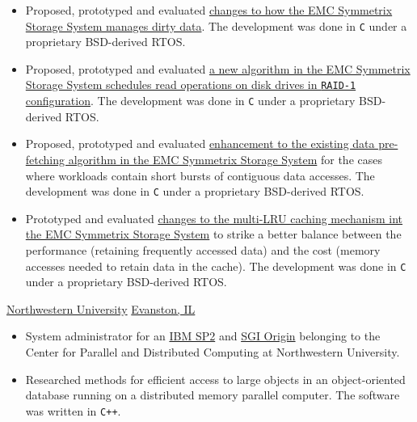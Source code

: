 \documentclass[10pt,a4paper,sans]{moderncv}
\newcommand{\evanston}{\href{https://www.cityofevanston.org/}{Evanston, IL}}
\newcommand{\northwestern}{\href{https://www.northwestern.edu/}{Northwestern University}}
\begin{document}
{
	\begin{itemize}
		\item Proposed, prototyped and evaluated
			\href{https://patentimages.storage.googleapis.com/59/4b/0d/64a4ee1769c704/US7437515.pdf}
			{changes to how the EMC Symmetrix Storage System manages dirty data}.
			The development was done in \texttt{C} under a proprietary BSD-derived RTOS.
		\item Proposed, prototyped and evaluated
			\href{https://patentimages.storage.googleapis.com/e6/95/d6/fda2d287286a2d/US6954833.pdf}
			{a new algorithm in the EMC Symmetrix Storage System schedules read
			operations on disk drives in \texttt{RAID-1} configuration}.
			The development was done in \texttt{C} under a proprietary BSD-derived RTOS.
		\item Proposed, prototyped and evaluated 
			\href{https://patentimages.storage.googleapis.com/c6/ad/4f/ad550b2e923d0d/US6721870.pdf}
			{enhancement to the existing data pre-fetching algorithm
			in the EMC Symmetrix Storage System} for the cases where workloads contain short bursts of
			contiguous data accesses. The development was done in \texttt{C} under a proprietary BSD-derived RTOS.
		\item Prototyped and evaluated
			\href{https://patentimages.storage.googleapis.com/2a/d0/49/84736ddbd4d47b/US6715039.pdf}
			{changes to the multi-LRU caching mechanism int the EMC Symmetrix Storage
			System} to strike a better balance between the performance (retaining
			frequently accessed data) and the cost
			(memory accesses needed to retain data in the cache).
			The development was done in \texttt{C} under a proprietary BSD-derived RTOS.
	\end{itemize}
}
{\northwestern}
{\evanston}
{\begin{itemize}
		\item System administrator for an \href{https://en.wikipedia.org/wiki/IBM_Scalable_POWERparallel}
			{IBM SP2} and \href{https://en.wikipedia.org/wiki/SGI_Origin_2000}
			{SGI Origin} belonging to the
		Center for Parallel and Distributed Computing at Northwestern University.
	\item Researched methods for efficient access to large objects in an object-oriented
		database running on a distributed memory parallel computer. The
		software was written in \texttt{C++}.
	\end{itemize}}
\end{document}
